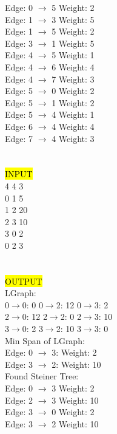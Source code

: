 \documentclass[a4paper]{article}
\begin{document}
Edge: 0 $\rightarrow$ 5 Weight: 2\\
Edge: 1 $\rightarrow$ 3 Weight: 5\\
Edge: 1 $\rightarrow$ 5 Weight: 2\\
Edge: 3 $\rightarrow$ 1 Weight: 5\\
Edge: 4 $\rightarrow$ 5 Weight: 1\\
Edge: 4 $\rightarrow$ 6 Weight: 4\\
Edge: 4 $\rightarrow$ 7 Weight: 3\\
Edge: 5 $\rightarrow$ 0 Weight: 2\\
Edge: 5 $\rightarrow$ 1 Weight: 2\\
Edge: 5 $\rightarrow$ 4 Weight: 1\\
Edge: 6 $\rightarrow$ 4 Weight: 4\\
Edge: 7 $\rightarrow$ 4 Weight: 3\\
\\
\\
\hl{INPUT}\\
4 4 3\\
0 1 5\\
1 2 20\\
2 3 10\\
3 0 2\\
0 2 3\\
\\
\\
\hl{OUTPUT}\\
LGraph:\\
0$\rightarrow$0: 0       0$\rightarrow$2: 12      0$\rightarrow$3: 2\\
2$\rightarrow$0: 12      2$\rightarrow$2: 0       2$\rightarrow$3: 10\\
3$\rightarrow$0: 2       3$\rightarrow$2: 10      3$\rightarrow$3: 0\\
Min Span of LGraph:\\
Edge: 0 $\rightarrow$ 3: Weight: 2\\
Edge: 3 $\rightarrow$ 2: Weight: 10\\
Found Steiner Tree:\\
Edge: 0 $\rightarrow$ 3 Weight: 2\\
Edge: 2 $\rightarrow$ 3 Weight: 10\\
Edge: 3 $\rightarrow$ 0 Weight: 2\\
Edge: 3 $\rightarrow$ 2 Weight: 10\\
	\nocite{*}	


\end{document}
